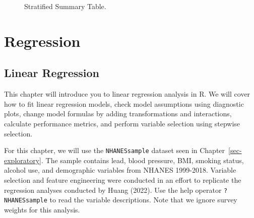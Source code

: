 \documentclass[
  letterpaper,
]{krantz}
\begin{document}
\begin{figure}


\caption{\label{fig-pain-stratified-summary}Stratified Summary Table.}

\end{figure}%

\part{Regression}

\chapter{Linear Regression}\label{sec-linear-regression}

This chapter will introduce you to linear regression analysis in R. We
will cover how to fit linear regression models, check model assumptions
using diagnostic plots, change model formulas by adding transformations
and interactions, calculate performance metrics, and perform variable
selection using stepwise selection.

For this chapter, we will use the \texttt{NHANESsample} dataset seen in
Chapter~\ref{sec-exploratory}. The sample contains lead, blood pressure,
BMI, smoking status, alcohol use, and demographic variables from NHANES
1999-2018. Variable selection and feature engineering were conducted in
an effort to replicate the regression analyses conducted by Huang
(2022). Use the help operator \texttt{?NHANESsample} to read the
variable descriptions. Note that we ignore survey weights for this
analysis.
\end{document}
